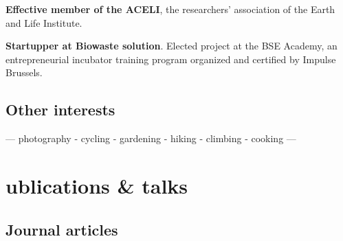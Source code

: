 \documentclass[11pt, a4paper]{article} %
\newcommand{\years}[1]{\marginnote{\footnotesize #1}} %
\begin{document}
\years{\raggedleft2013-2015} \textbf{Effective member of the ACELI}, the  researchers' association of the Earth and Life Institute.\\\vspace{-0.3cm}


\years{\raggedleft2014} \textbf{Startupper at Biowaste solution}.  Elected project at the BSE Academy, an entrepreneurial incubator training program organized and certified by Impulse Brussels.


\subsection*{\hspace{-2.4cm}Other interests}
--- photography
- cycling
- gardening
- hiking
- climbing
- cooking ---




\section*{ublications \& talks \hrulefill}

\subsection*{\hspace{-2.4cm}Journal articles}

\def\FormatName#1{%
  \IfSubStr{#1}{Waldner}{\textbf{#1}}{#1}%
}


\nocite{waldner2017defining, waldner2017smote,loew2017abandonment,loew2017fergana,jacques2017, low2016timely, bogaert2016information, radoux2016sentinel, waldner2016towards, lambert2016cropland, tennant2016academic, waldner2016unified, beriaux2015maize, li2015generic, matton2015automated, waldner2015operational, waldner2015automated, waldner2015land, waldner2015mapping, renier2015dynamic}



\begingroup
\renewcommand{\section}[2]{}%


\endgroup
\end{document}
